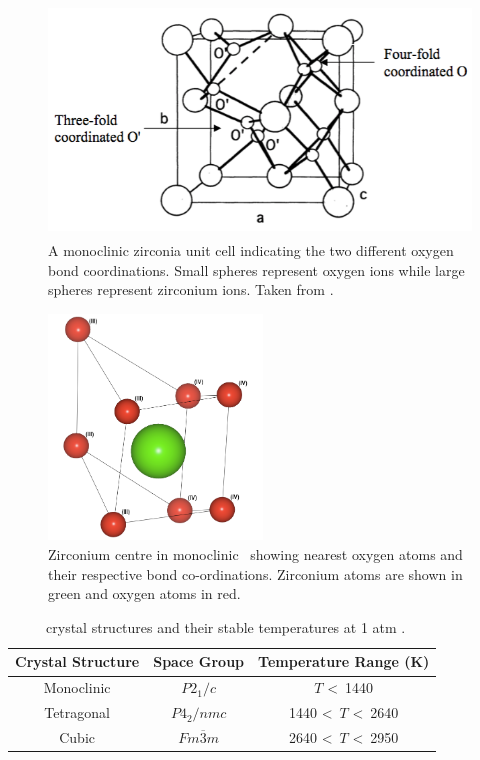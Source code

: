 \begin{figure}[htp] %
\centering
\includegraphics[height=6.2cm]{images/coordination.png}
\caption{A monoclinic zirconia unit cell indicating the two different oxygen bond coordinations. Small spheres represent oxygen ions while large spheres represent zirconium ions. Taken from \cite{Xia2010}.
\label{figure:coordination}}
\end{figure}

\begin{figure}[htp] %
\centering
\includegraphics[height=6cm]{images/zr_centre_mono.png}
\caption{Zirconium centre in monoclinic \zirconia\ showing nearest oxygen atoms and their respective bond co-ordinations. Zirconium atoms are shown in green and oxygen atoms in red.}
\label{figure:monoschottky}
\end{figure}


\begin{table}[htp]
\centering
\onehalfspacing
\caption{\zirconia\ crystal structures and their stable temperatures at 1 atm \cite{Howard1988}.}
\label{table:phases}
\begin{tabular}{ccc}
\hline
{Crystal Structure} & {Space Group}    & {Temperature Range (K)} \\ \hline
\multicolumn{1}{c}{Monoclinic} & \multicolumn{1}{c}{$P2_1/c$} & \multicolumn{1}{c}{$T$ \textless\ 1440}     \\
\multicolumn{1}{c}{Tetragonal} & \multicolumn{1}{c}{$P4_2/nmc$} & \multicolumn{1}{c}{1440 \textless\ $T$ \textless\ 2640}        \\
\multicolumn{1}{c}{Cubic} & \multicolumn{1}{c}{$Fm\overline{3}m$}     & \multicolumn{1}{c}{2640 \textless\ $T$ \textless\ 2950}      \\ \hline
\end{tabular}
\end{table}

